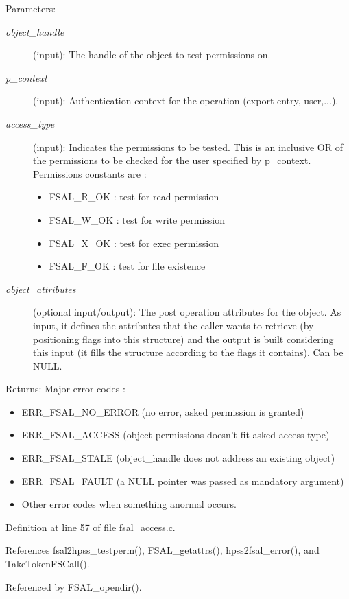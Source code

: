 \begin{Desc}
\item[Parameters:]
\begin{description}
\item[{\em object\_\-handle}](input): The handle of the object to test permissions on. \item[{\em p\_\-context}](input): Authentication context for the operation (export entry, user,...). \item[{\em access\_\-type}](input): Indicates the permissions to be tested. This is an inclusive OR of the permissions to be checked for the user specified by p\_\-context. Permissions constants are :\begin{itemize}
\item FSAL\_\-R\_\-OK : test for read permission\item FSAL\_\-W\_\-OK : test for write permission\item FSAL\_\-X\_\-OK : test for exec permission\item FSAL\_\-F\_\-OK : test for file existence \end{itemize}
\item[{\em object\_\-attributes}](optional input/output): The post operation attributes for the object. As input, it defines the attributes that the caller wants to retrieve (by positioning flags into this structure) and the output is built considering this input (it fills the structure according to the flags it contains). Can be NULL.\end{description}
\end{Desc}
\begin{Desc}
\item[Returns:]Major error codes :\begin{itemize}
\item ERR\_\-FSAL\_\-NO\_\-ERROR (no error, asked permission is granted)\item ERR\_\-FSAL\_\-ACCESS (object permissions doesn't fit asked access type)\item ERR\_\-FSAL\_\-STALE (object\_\-handle does not address an existing object)\item ERR\_\-FSAL\_\-FAULT (a NULL pointer was passed as mandatory argument)\item Other error codes when something anormal occurs. \end{itemize}
\end{Desc}


Definition at line 57 of file fsal\_\-access.c.

References fsal2hpss\_\-testperm(), FSAL\_\-getattrs(), hpss2fsal\_\-error(), and Take\-Token\-FSCall().

Referenced by FSAL\_\-opendir().